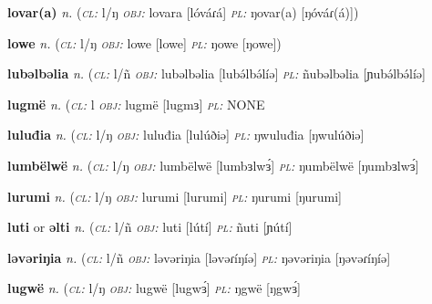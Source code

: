{\newentry
\headword\textbf{lovar(a)} 
\ipa{[lóváɾ(á)]}
\synpos\textit{n.} 
\class(\textit{\textsc{cl:}} {l/ŋ}
\object\textit{\textsc{obj:}} lovara [lóváɾá]
\plural\textit{\textsc{pl:}} ŋovar(a) [ŋóváɾ(á)])

\newentry
\headword\textbf{lowe} 
\ipa{[lowe]}
\synpos\textit{n.} 
\class(\textit{\textsc{cl:}} {l/ŋ}
\object\textit{\textsc{obj:}} lowe [lowe]
\plural\textit{\textsc{pl:}} ŋowe [ŋowe])

\newentry
\headword\textbf{lubəlbəlia} 
\synpos\textit{n.} 
\class(\textit{\textsc{cl:}} {l/ñ}
\object\textit{\textsc{obj:}} lubəlbəlia [lubə́lbə́líə]
\plural\textit{\textsc{pl:}} ñubəlbəlia [ɲubə́lbə́líə]

\newentry
\headword\textbf{lugmë} 
\ipa{[lugmɜ]}
\synpos\textit{n.} 
\class(\textit{\textsc{cl:}} {l}
\object\textit{\textsc{obj:}} lugmë [lugmɜ]
\plural\textit{\textsc{pl:}} NONE

\newentry
\headword\textbf{luluđia} 
\synpos\textit{n.} 
\class(\textit{\textsc{cl:}} {l/ŋ}
\object\textit{\textsc{obj:}} luluđia [lulúðiə]
\plural\textit{\textsc{pl:}} ŋwuluđia [ŋwulúðiə]

\newentry
\headword\textbf{lumbëlwë} 
\ipa{[lumbɜlwɜ́]}
\synpos\textit{n.} 
\class(\textit{\textsc{cl:}} {l/ŋ}
\object\textit{\textsc{obj:}} lumbëlwë [lumbɜlwɜ́]
\plural\textit{\textsc{pl:}} ŋumbëlwë [ŋumbɜlwɜ́]

\newentry
\headword\textbf{lurumi} 
\ipa{[lurumi]}
\synpos\textit{n.} 
\class(\textit{\textsc{cl:}} {l/ŋ}
\object\textit{\textsc{obj:}} lurumi [lurumi]
\plural\textit{\textsc{pl:}} ŋurumi [ŋurumi]

\newentry
\headword\textbf{luti} or \textbf{əlti}
\synpos\textit{n.} 
\class(\textit{\textsc{cl:}} {l/ñ}
\object\textit{\textsc{obj:}} luti [lútí]
\plural\textit{\textsc{pl:}} ñuti [ɲútí]

\newentry
\headword\textbf{ləvəriŋia} 
\ipa{[ləvəɾíŋíə]}
\synpos\textit{n.} 
\class(\textit{\textsc{cl:}} {l/ñ}
\object\textit{\textsc{obj:}} ləvəriŋia [ləvəɾíŋíə]
\plural\textit{\textsc{pl:}} ŋəvəriŋia [ŋəvəɾíŋíə]


\newentry
\headword\textbf{lugwë} 
\ipa{[lugwɜ́]}
\synpos\textit{n.} 
\class(\textit{\textsc{cl:}} {l/ŋ}
\object\textit{\textsc{obj:}} lugwë [lugwɜ́]
\plural\textit{\textsc{pl:}} ŋgwë [ŋgwɜ́]
		
}
